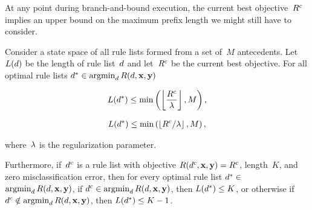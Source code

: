 At any point during branch-and-bound execution, the current best objective~${R^c}$
implies an upper bound on the maximum prefix length we might still have to consider.
%
\begin{theorem}
\label{thm:ub-prefix-length}
Consider a state space of all rule lists formed from a set of~$M$ antecedents.
%
Let~$L({d})$ be the length of rule list~${d}$
and let~${R^c}$ be the current best objective.
%
For all optimal rule lists ${d^* \in \operatorname*{argmin}_{d} R({d}, \mathbf{x}, \mathbf{y})}$
\begin{arxiv}
\begin{align}
L(d^*) \le \min \left(\left\lfloor \frac{{R^c}}{{\lambda}} \right\rfloor, M \right),
\label{eq:max-length}
\end{align}
\end{arxiv}
\begin{kdd}
\begin{align}
L(d^*) \le \min \left(\left\lfloor {R^c} / {\lambda} \right\rfloor, M \right),
\label{eq:max-length}
\end{align}
\end{kdd}
where~${\lambda}$ is the regularization parameter.
%
\begin{arxiv}
Furthermore, if~$d^c$ is a rule list with
objective ${R(d^c, \mathbf{x}, \mathbf{y}) = {R^c}}$,
length~$K$, and zero misclassification error,
then for every optimal rule list
${d^* \in}$ ${\operatorname*{argmin}_{d} R({d}, \mathbf{x}, \mathbf{y})}$,
if ${d^c \in \operatorname*{argmin}_d R({d}, \mathbf{x}, \mathbf{y})}$,
then ${L(d^*) \le K}$,
or otherwise if ${d^c \notin \operatorname*{argmin}_d R({d}, \mathbf{x}, \mathbf{y})}$,
then ${L(d^*) \le K - 1}$.
\end{arxiv}
\end{theorem}

